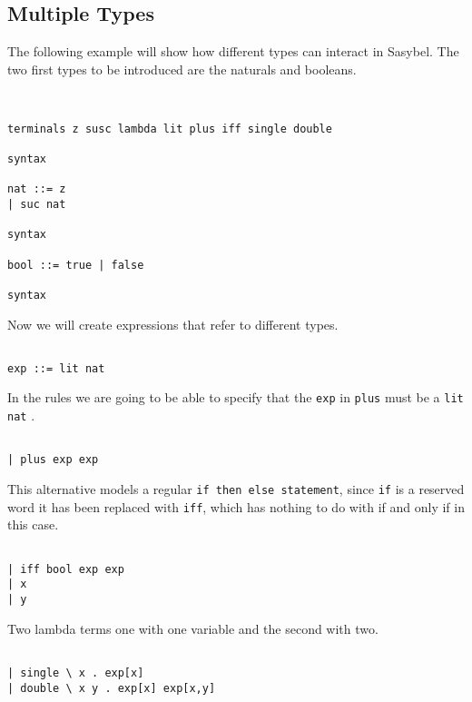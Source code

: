 \documentclass[12pt]{article}
\begin{document}
\subsection{Multiple Types}
The following example will show how different types can interact in \textmd{Sasybel}. The two first types to be introduced are the naturals and booleans.
\begin{verbatim}


terminals z susc lambda lit plus iff single double 

syntax 

nat ::= z
| suc nat

syntax

bool ::= true | false

syntax

\end{verbatim}
Now we will create expressions that refer to different types.
\begin{verbatim}

exp ::= lit nat

\end{verbatim}
In the rules we are going to be able to specify that the {\tt exp} in {\tt plus} must be a {\tt lit nat} .
\begin{verbatim}
 
| plus exp exp

\end{verbatim}
This alternative models a regular {\tt if  then  else statement}, since {\tt if} is a reserved word it has been replaced with {\tt iff}, which has nothing to do with if and only if in this case.
\begin{verbatim}
 
| iff bool exp exp
| x
| y 

\end{verbatim}
Two lambda terms one with one variable and the second with two.
\begin{verbatim}
 
| single \ x . exp[x] 
| double \ x y . exp[x] exp[x,y]

\end{verbatim}
\end{document}
